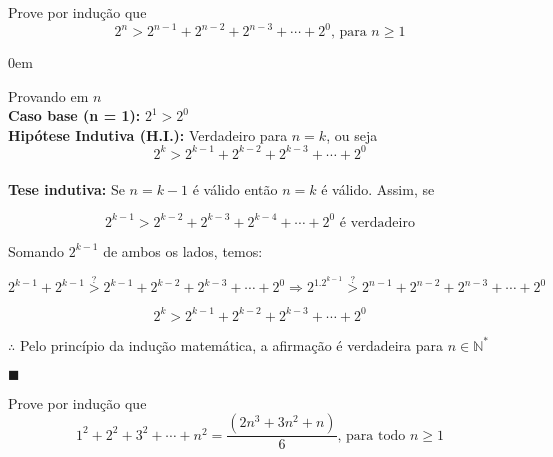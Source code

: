 \documentclass[12pt]{article}
\newcommand{\N}{\mathbb{N}}
\renewcommand{\qed}{\hfill$\blacksquare$}
\renewenvironment{proof}{\begin{addmargin}[1em]{0em}\begin{newproof}}{\end{newproof}\end{addmargin}\qed}
\newenvironment{problem}[2][Problema]{\begin{trivlist}
\item[\hskip \labelsep {\bfseries #1}\hskip \labelsep {\bfseries #2.}]}{\end{trivlist}}
\begin{document}
 

 
 
\begin{problem}{1}
Prove por indução que $$2^n > 2^{n-1} + 2^{n-2} + 2^{n-3} + \cdots + 2^0 \text{, para } n \ge 1$$
\end{problem}

\begin{proof}
    Provando em $n$ \\
    \textbf{Caso base (n = 1):  } $2^1 > 2^0$ \\
    \textbf{Hipótese Indutiva (H.I.): } Verdadeiro para $n=k$, ou seja $$2^k > 2^{k-1} + 2^{k-2} + 2^{k-3} + \cdots + 2^0$$ \\
    \textbf{Tese indutiva: } Se $n = k-1$ é válido então $n = k$ é válido. Assim, se
    
    $$2^{k-1} > 2^{k-2} + 2^{k-3} + 2^{k-4} + \cdots + 2^0 \text{ é verdadeiro}$$

    Somando $2^{k-1}$ de ambos os lados, temos:

    $$2^{k-1} + 2^{k-1} \stackrel{?}{>} 2^{k-1} + 2^{k-2} + 2^{k-3} + \cdots + 2^0 \Longrightarrow 2^1.2^{k-1} \stackrel{?}{>} 2^{n-1} + 2^{n-2} + 2^{n-3} + \cdots + 2^0$$

    \begin{equation*}
        \boxed{2^{k} > 2^{k-1} + 2^{k-2} + 2^{k-3} + \cdots + 2^0}
    \end{equation*}

    $\therefore$ Pelo princípio da indução matemática, a afirmação é verdadeira para $n \in \N^*$
\end{proof}

\newpage

\begin{problem}{2}
    Prove por indução que $$1^2 + 2^2 + 3^2 + \cdots + n^2 = \frac{(2n^3 + 3n^2 + n)}{6} \text{, para todo } n \ge 1$$
\end{problem}
\end{document}
